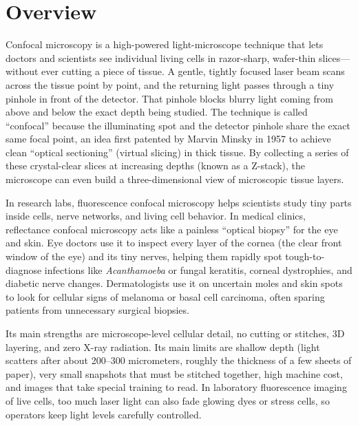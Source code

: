 \label{ch:infographic-confocal}

\section{Overview}

Confocal microscopy is a high-powered light-microscope technique that lets doctors and scientists see individual living cells in razor-sharp, wafer-thin slices---without ever cutting a piece of tissue. A gentle, tightly focused laser beam scans across the tissue point by point, and the returning light passes through a tiny pinhole in front of the detector. That pinhole blocks blurry light coming from above and below the exact depth being studied. The technique is called ``confocal'' because the illuminating spot and the detector pinhole share the exact same focal point, an idea first patented by Marvin Minsky in 1957 to achieve clean ``optical sectioning'' (virtual slicing) in thick tissue. By collecting a series of these crystal-clear slices at increasing depths (known as a Z-stack), the microscope can even build a three-dimensional view of microscopic tissue layers.

In research labs, fluorescence confocal microscopy helps scientists study tiny parts inside cells, nerve networks, and living cell behavior. In medical clinics, reflectance confocal microscopy acts like a painless ``optical biopsy'' for the eye and skin. Eye doctors use it to inspect every layer of the cornea (the clear front window of the eye) and its tiny nerves, helping them rapidly spot tough-to-diagnose infections like \textit{Acanthamoeba} or fungal keratitis, corneal dystrophies, and diabetic nerve changes. Dermatologists use it on uncertain moles and skin spots to look for cellular signs of melanoma or basal cell carcinoma, often sparing patients from unnecessary surgical biopsies.

Its main strengths are microscope-level cellular detail, no cutting or stitches, 3D layering, and zero X-ray radiation. Its main limits are shallow depth (light scatters after about 200--300 micrometers, roughly the thickness of a few sheets of paper), very small snapshots that must be stitched together, high machine cost, and images that take special training to read. In laboratory fluorescence imaging of live cells, too much laser light can also fade glowing dyes or stress cells, so operators keep light levels carefully controlled.

